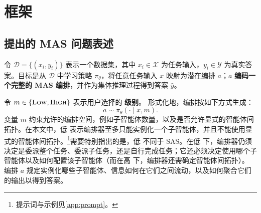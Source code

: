 \section{\ourframework 框架}
\label{sec.framework}

\subsection{提出的 MAS 问题表述}



令 $\mathcal{D} = \{(x_i, y_i)\}$ 表示一个数据集，其中 $x_i \in \mathcal{X}$ 为任务输入，$y_i \in \mathcal{Y}$ 为真实答案。目标是从 $\mathcal{D}$ 中学习策略 $\pi_\theta$，将任意任务输入 ${x}$ 映射为潜在编排 $a$；$a$ \textbf{编码一个完整的 MAS 编排}，并作为集体推理过程得到答案 $\hat{y}$。

令 $m \in \{\textsc{Low},\textsc{High}\}$ 表示用户选择的 \textbf{\masness 级别}。
形式化地，编排按如下方式生成：
\begin{equation}
a \sim \pi_\theta(\cdot \mid x, m).
\end{equation}
\masness 变量 $m$ 约束允许的编排空间，例如子智能体数量，以及是否允许显式的智能体间拓扑。在本文中，低 \masness 表示编排器至多只能实例化一个子智能体，并且不能使用显式的智能体间拓扑。\footnote{提示词与示例见\cref{app:prompt}。}需要特别指出的是，低 \masness 不同于 SAS。在低 \masness 下，编排器仍须决定是委派整个任务、委派子任务，还是自行完成任务；它还必须决定使用哪个子智能体以及如何配置该子智能体（而在高 \masness 下，编排器还需确定智能体间拓扑）。
编排 $a$ 规定实例化哪些子智能体、信息如何在它们之间流动，以及如何聚合它们的输出以得到答案。

